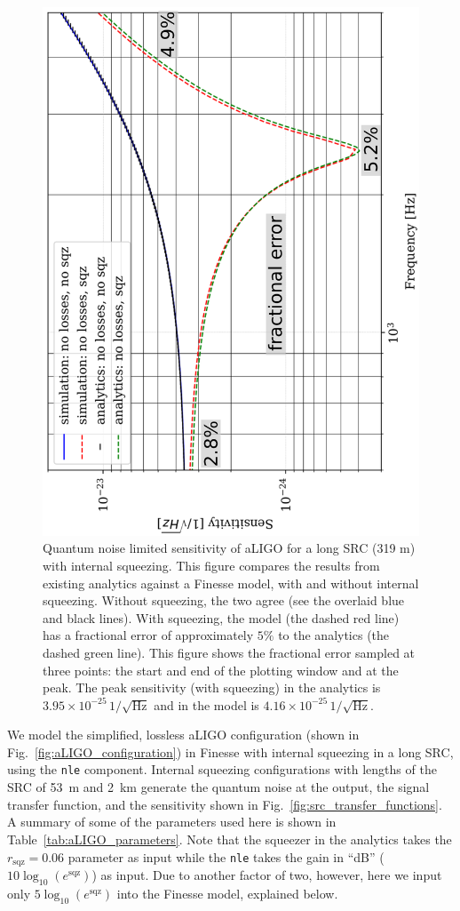 \documentclass[aps,pra,superscriptaddress,reprint,nofootinbib]{revtex4-1}
\newcommand{\code}[1]{\texttt{#1}}
\begin{document}
\begin{figure}[ht]
	\begin{center}
	\includegraphics[height=0.65\textwidth, angle=-90]{figures/sqz_aLIGO_analytics_v_simulation_with_fractional_errors.pdf}
	\end{center}
	\caption{Quantum noise limited sensitivity of aLIGO for a long SRC (319 m) with internal squeezing. This figure compares the results from existing analytics against a Finesse model, with and without internal squeezing. Without squeezing, the two agree (see the overlaid blue and black lines). With squeezing, the model (the dashed red line) has a fractional error of approximately $5\%$ to the analytics (the dashed green line). This figure shows the fractional error sampled at three points: the start and end of the plotting window and at the peak. The peak sensitivity (with squeezing) in the analytics is $3.95 \times 10^{-25}\, 1/\sqrt{\mathrm{Hz}}$ and in the model is $4.16 \times 10^{-25} \, 1/\sqrt{\mathrm{Hz}}$.}
	\label{fig:sqz_aLIGO_analytics_v_simulation}
\end{figure}

We model the simplified, lossless aLIGO configuration (shown in Fig.~\ref{fig:aLIGO_configuration}) in Finesse with internal squeezing in a long SRC, using the \code{nle} component. Internal squeezing configurations with lengths of the SRC of 53~m and 2~km generate the quantum noise at the output, the signal transfer function, and the sensitivity shown in Fig.~\ref{fig:src_transfer_functions}. A summary of some of the parameters used here is shown in Table~\ref{tab:aLIGO_parameters}. Note that the squeezer in the analytics takes the $r_\mathrm{sqz} = 0.06$ parameter as input while the \code{nle} takes the gain in “dB” ($10 \log_{10}(e^\mathrm{sqz})$) as input. Due to another factor of two, however, here we input only $5 \log_{10}(e^\mathrm{sqz})$ into the Finesse model, explained below.
\end{document}
